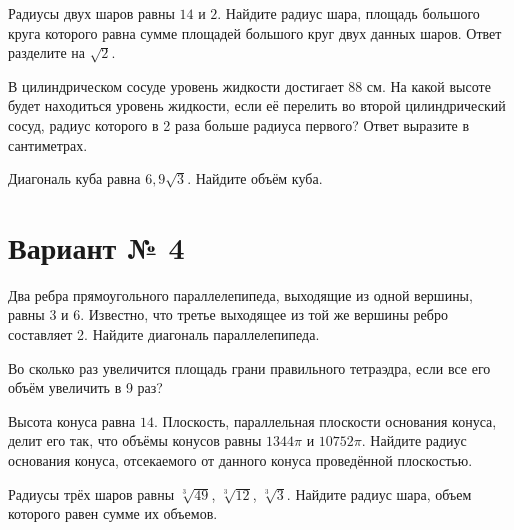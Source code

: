 \documentclass[4apaper]{article}
\begin{document}
\begin{taskBN}{4}
Радиусы двух шаров равны $14$ и $2$. Найдите радиус шара, площадь большого круга которого равна сумме площадей большого круг двух данных шаров. Ответ разделите на $\sqrt{2}$.
\end{taskBN}

\begin{taskBN}{5}
В цилиндрическом сосуде уровень жидкости достигает 88 см. На какой высоте будет находиться уровень жидкости, если её перелить во второй цилиндрический сосуд, радиус которого в 2 раза больше радиуса первого? Ответ выразите в сантиметрах.
\end{taskBN}

\begin{taskBN}{6}
Диагональ куба равна $6,9\sqrt{3}$. Найдите объём куба.
\end{taskBN}
\newpage\section*{Вариант № 4}

\begin{taskBN}{1}
Два ребра прямоугольного параллелепипеда, выходящие из одной вершины, равны 3 и 6. Известно, что третье выходящее из той же вершины ребро составляет 2. Найдите диагональ параллелепипеда.
\end{taskBN}

\begin{taskBN}{2}
Во сколько раз увеличится площадь грани правильного тетраэдра, если все его объём увеличить в 9 раз?
\end{taskBN}

\begin{taskBN}{3}
Высота конуса равна $14$. Плоскость, параллельная плоскости основания конуса,  делит его так, что объёмы конусов равны $1344\pi$ и $10752\pi$. Найдите радиус основания конуса, отсекаемого от данного конуса проведённой плоскостью. 
\end{taskBN}

\begin{taskBN}{4}
Радиусы трёх шаров равны $\sqrt[3]{49}$, $\sqrt[3]{12}$, $\sqrt[3]{3}$. Найдите радиус шара, объем которого равен сумме их объемов.
\end{taskBN}
\end{document}
